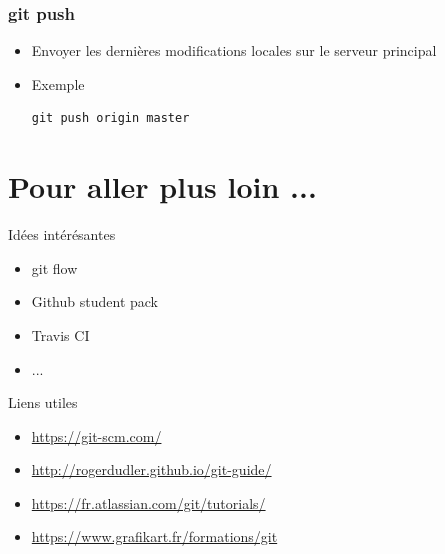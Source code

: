 \documentclass{beamer}
\begin{document}
\begin{frame}[fragile]
\frametitle{git push}

\begin{itemize}
\item Envoyer les dernières modifications locales sur le serveur principal
\item Exemple
\begin{lstlisting}
git push origin master
\end{lstlisting}
\end{itemize}
\end{frame}

\section{Pour aller plus loin ...}

\begin{frame}{Idées intérésantes}
\begin{itemize}
    \item git flow
    \item Github student pack
    \item Travis CI
    \item ...
\end{itemize}
\end{frame}

\begin{frame}{Liens utiles}
\begin{itemize}
    \item \url{https://git-scm.com/}
    \item \url{http://rogerdudler.github.io/git-guide/}
    \item \url{https://fr.atlassian.com/git/tutorials/}
    \item \url{https://www.grafikart.fr/formations/git}
\end{itemize}
\end{frame}

\end{document}
